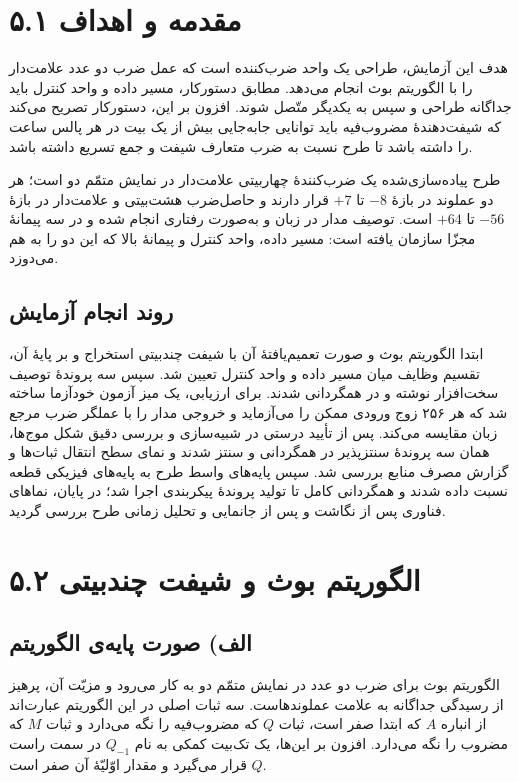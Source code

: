 \documentclass[12pt,a4paper]{article}
\begin{document}

	\section*{۵.۱ مقدمه و اهداف}
	هدف این آزمایش، طراحی یک واحد ضرب‌کننده است که عمل ضرب دو عدد علامت‌دار را با الگوریتم بوث انجام می‌دهد. مطابق دستورکار، مسیر داده و واحد کنترل باید جداگانه طراحی و سپس به یکدیگر متّصل شوند. افزون بر این، دستورکار تصریح می‌کند که شیفت‌دهندهٔ مضروب‌فیه باید توانایی جابه‌جایی بیش از یک بیت در هر پالس ساعت را داشته باشد تا طرح نسبت به ضرب متعارف شیفت و جمع تسریع داشته باشد.

	طرح پیاده‌سازی‌شده یک ضرب‌کنندهٔ چهاربیتی علامت‌دار در نمایش متمّم دو است؛ هر دو عملوند در بازهٔ \(-8\) تا \(+7\) قرار دارند و حاصل‌ضرب هشت‌بیتی و علامت‌دار در بازهٔ \(-56\) تا \(+64\) است. توصیف مدار در زبان  و به‌صورت رفتاری انجام شده و در سه پیمانهٔ مجزّا سازمان یافته است: مسیر داده، واحد کنترل و پیمانهٔ بالا که این دو را به هم می‌دوزد.

	\subsection*{روند انجام آزمایش}
	ابتدا الگوریتم بوث و صورت تعمیم‌یافتهٔ آن با شیفت چندبیتی استخراج و بر پایهٔ آن، تقسیم وظایف میان مسیر داده و واحد کنترل تعیین شد. سپس سه پروندهٔ توصیف سخت‌افزار نوشته و در  همگردانی شدند. برای ارزیابی، یک میز آزمون خودآزما ساخته شد که هر ۲۵۶ زوج ورودی ممکن را می‌آزماید و خروجی مدار را با عملگر ضرب مرجع زبان مقایسه می‌کند. پس از تأیید درستی در شبیه‌سازی و بررسی دقیق شکل موج‌ها، همان سه پروندهٔ سنتز‌پذیر در  همگردانی و سنتز شدند و نمای سطح انتقال ثبات‌ها و گزارش مصرف منابع بررسی شد. سپس پایه‌های واسط طرح به پایه‌های فیزیکی قطعه نسبت داده شدند و همگردانی کامل تا تولید پروندهٔ پیکربندی اجرا شد؛ در پایان، نماهای فناوری پس از نگاشت و پس از جانمایی و تحلیل زمانی طرح بررسی گردید.

	\section*{۵.۲ الگوریتم بوث و شیفت چندبیتی}
	\subsection*{الف) صورت پایه‌ی الگوریتم}
	الگوریتم بوث برای ضرب دو عدد در نمایش متمّم دو به کار می‌رود و مزیّت آن، پرهیز از رسیدگی جداگانه به علامت عملوندهاست. سه ثبات اصلی در این الگوریتم عبارت‌اند از انباره \(A\) که ابتدا صفر است، ثبات \(Q\) که مضروب‌فیه را نگه می‌دارد و ثبات \(M\) که مضروب را نگه می‌دارد. افزون بر این‌ها، یک تک‌بیت کمکی به نام \(Q_{-1}\) در سمت راست \(Q\) قرار می‌گیرد و مقدار اوّلیّهٔ آن صفر است.
\end{document}

